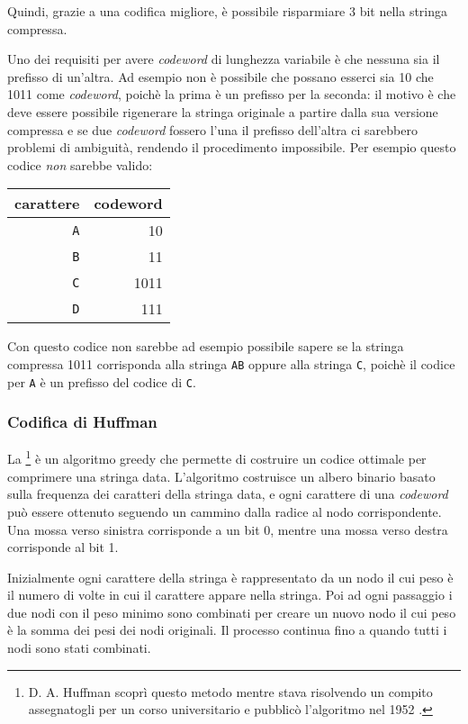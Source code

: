 Quindi, grazie a una codifica migliore, è possibile
risparmiare 3 bit nella stringa compressa.

Uno dei requisiti per avere \emph{codeword} di lunghezza variabile
è che nessuna sia il prefisso di un'altra.
Ad esempio non è possibile che possano esserci sia
10 che 1011 come \emph{codeword}, poichè la prima è un prefisso per
la seconda: il motivo è che deve essere
possibile rigenerare la stringa originale a partire dalla
sua versione compressa e se due \emph{codeword} fossero l'una il 
prefisso dell'altra ci sarebbero problemi di ambiguità, rendendo
il procedimento impossibile.
Per esempio questo codice \emph{non} sarebbe valido:
\begin{center}
\begin{tabular}{rr}
carattere & codeword \\
\hline
\texttt{A} & 10 \\
\texttt{B} & 11 \\
\texttt{C} & 1011 \\
\texttt{D} & 111 \\
\end{tabular}
\end{center}
Con questo codice non sarebbe ad esempio possibile
sapere se la stringa compressa 1011 corrisponda alla 
stringa \texttt{AB} oppure alla stringa \texttt{C},
poichè il codice per \texttt{A} è un prefisso del codice di \texttt{C}.


\subsubsection{Codifica di Huffman}

La \footnote{D. A. Huffman scoprì questo 
metodo mentre stava risolvendo un compito assegnatogli
per un corso universitario e pubblicò l'algoritmo nel 1952 \cite{huf52}.} 
è un algoritmo greedy che permette di costruire un 
codice ottimale per comprimere una stringa data. 
L'algoritmo costruisce un albero binario
basato sulla frequenza dei caratteri della stringa data,
e ogni carattere di una \emph{codeword} può essere ottenuto 
seguendo un cammino dalla radice al nodo corrispondente.
Una mossa verso sinistra corrisponde a un bit 0,
mentre una mossa verso destra corrisponde al bit 1.

Inizialmente ogni carattere della stringa
è rappresentato da un nodo il cui peso è il numero di
volte in cui il carattere appare nella stringa.
Poi ad ogni passaggio i due nodi con il peso minimo
sono combinati per creare un nuovo nodo
il cui peso è la somma dei pesi dei nodi originali.
Il processo continua fino a quando tutti i nodi sono stati combinati.

